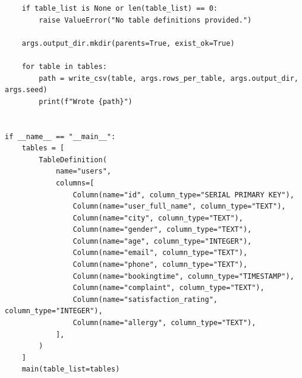 \documentclass[a4paper,11pt]{report} %
\theoremstyle{change}
\theoremstyle{theoremstyle}
\begin{document}
\begin{verbatim}
    if table_list is None or len(table_list) == 0:
        raise ValueError("No table definitions provided.")

    args.output_dir.mkdir(parents=True, exist_ok=True)

    for table in tables:
        path = write_csv(table, args.rows_per_table, args.output_dir, args.seed)
        print(f"Wrote {path}")


if __name__ == "__main__":
    tables = [
        TableDefinition(
            name="users",
            columns=[
                Column(name="id", column_type="SERIAL PRIMARY KEY"),
                Column(name="user_full_name", column_type="TEXT"),
                Column(name="city", column_type="TEXT"),
                Column(name="gender", column_type="TEXT"),
                Column(name="age", column_type="INTEGER"),
                Column(name="email", column_type="TEXT"),
                Column(name="phone", column_type="TEXT"),
                Column(name="bookingtime", column_type="TIMESTAMP"),
                Column(name="complaint", column_type="TEXT"),
                Column(name="satisfaction_rating", column_type="INTEGER"),
                Column(name="allergy", column_type="TEXT"),
            ],
        )
    ]
    main(table_list=tables)
\end{verbatim}
\end{document}
